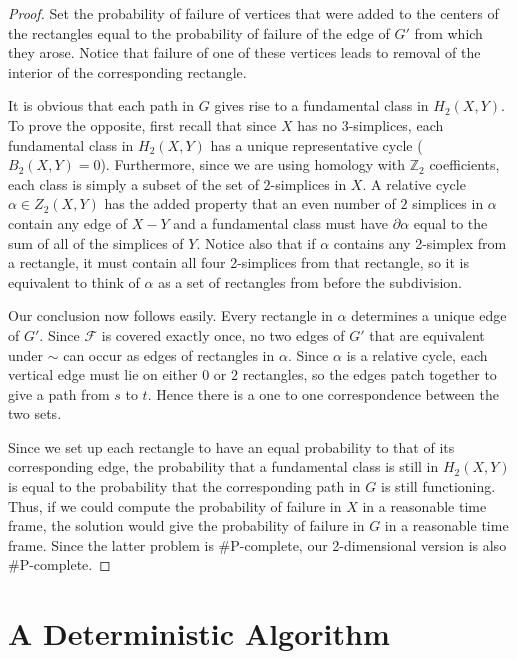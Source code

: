 \documentclass[10pt,twocolumn]{article} \usepackage{amsmath,epsf,amssymb,cite,pifont,amsthm, mathrsfs,epsfig,  bbm, amsthm,  setspace}
\newcommand{\FF}{\mathcal F}
\newcommand{\Z}{\mathbb Z}
\renewcommand{\1}{\mathbbm{1}}
\begin{document}
\begin{proof}
Set the probability of
failure of vertices that were added to the centers of the rectangles
equal to the probability of failure of the edge of $G'$ from which they arose.
Notice that failure of one of these vertices
leads to removal of the interior of the corresponding rectangle.

It is obvious that each path in $G$ gives rise to a fundamental class in $H_2(X,Y)$.
To prove the opposite, first recall that since $X$ has no $3$-simplices, each fundamental
class in $H_2(X,Y)$ has a unique representative cycle ($B_2(X,Y) = 0$).
Furthermore, since we are using homology with $\Z_2$ coefficients,
each class is simply a subset of the set of $2$-simplices in $X$.
A relative cycle $\alpha \in Z_2(X,Y)$ has the added property that an even number of
$2$ simplices in $\alpha$ contain any edge of $X-Y$
and a fundamental class must have $\partial \alpha$ equal to the sum of all of
the simplices of $Y$.
Notice also that if $\alpha$ contains any  2-simplex from a rectangle, it must contain all
four 2-simplices from that rectangle,
so it is equivalent to think of $\alpha$ as a set of rectangles from before the subdivision.

Our conclusion now follows easily.
Every rectangle in $\alpha$ determines a unique edge of $G'$.
Since $\FF$ is covered exactly once, no two edges of $G'$ that
are equivalent under $\sim$ can occur as edges of rectangles in $\alpha$.
Since $\alpha$ is a relative cycle, each vertical edge must lie on either
$0$ or $2$ rectangles, so the edges patch together to give a path from
$s$ to $t$.
Hence there is a one to one correspondence between the two sets.

Since we set up each rectangle to have an equal probability to that of its corresponding edge,
the probability that a fundamental class is still in $H_2(X,Y)$ is equal to the probability that
the corresponding path in $G$ is still functioning.
Thus, if we could compute the probability of failure in $X$ in a reasonable time frame, the solution would
give the probability of failure in $G$ in a reasonable time frame.
Since the latter problem is \#P-complete, our 2-dimensional version is also \#P-complete.

\end{proof}


\section{A Deterministic Algorithm}\label{S: Deterministic Algorithm}
\end{document}
